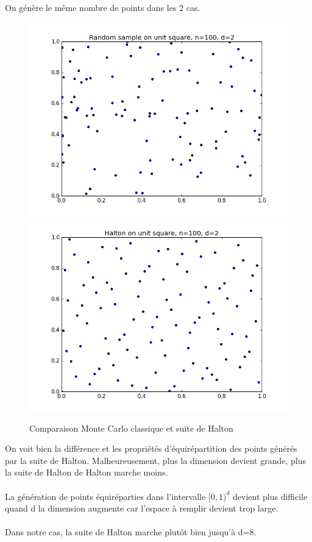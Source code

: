 \documentclass[12pt]{report}
\begin{document}
On génère le même nombre de points dans les 2 cas.\\
\begin{figure}[!h]
\centering
\includegraphics[scale=0.5]{figure_2-halton-random-sample.png}
\includegraphics[scale=0.5]{figure_2-halton-halton.png}
\caption{Comparaison Monte Carlo classique et suite de Halton}
\end{figure}

On voit bien la différence et les propriétés d'équirépartition des points générés par la suite de Halton.
Malheureusement, plus la dimension devient grande, plus la suite de Halton de Halton marche moins.\\\\
La génération de points équiréparties dans l'intervalle $[0,1)^d$ devient plus difficile quand d la dimension augmente car l'espace à remplir devient trop large.\\\\
Dans notre cas, la suite de Halton marche plutôt bien jusqu'à d=8.\\
\end{document}
